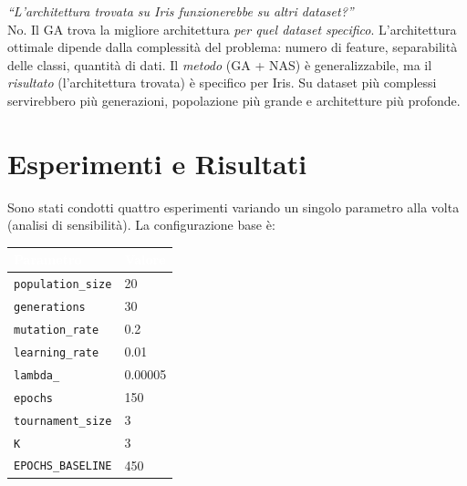 \documentclass[12pt, a4paper]{article}
\begin{document}
\begin{domanda}
\textit{``L'architettura trovata su Iris funzionerebbe su altri dataset?''}\\
No. Il GA trova la migliore architettura \emph{per quel dataset specifico}.
L'architettura ottimale dipende dalla complessità del problema: numero di
feature, separabilità delle classi, quantità di dati. Il \emph{metodo}
(GA + NAS) è generalizzabile, ma il \emph{risultato} (l'architettura trovata)
è specifico per Iris. Su dataset più complessi servirebbero più generazioni,
popolazione più grande e architetture più profonde.
\end{domanda}

\newpage

\section{Esperimenti e Risultati}

Sono stati condotti quattro esperimenti variando un singolo parametro alla
volta (analisi di sensibilità). La configurazione base è:

\vspace{0.3cm}
\begin{center}
\begin{tabular}{ll}
    \toprule
    \rowcolor{headerblue}
    \textcolor{white}{\textbf{Parametro}} & \textcolor{white}{\textbf{Valore}} \\
    \midrule
    \texttt{population\_size}   & 20      \\
    \rowcolor{rowgray}
    \texttt{generations}        & 30      \\
    \texttt{mutation\_rate}     & 0.2     \\
    \rowcolor{rowgray}
    \texttt{learning\_rate}     & 0.01    \\
    \texttt{lambda\_}           & 0.00005 \\
    \rowcolor{rowgray}
    \texttt{epochs}             & 150     \\
    \texttt{tournament\_size}   & 3       \\
    \rowcolor{rowgray}
    \texttt{K}                  & 3       \\
    \texttt{EPOCHS\_BASELINE}   & 450     \\
    \bottomrule
\end{tabular}
\end{center}
\vspace{0.3cm}
\end{document}
